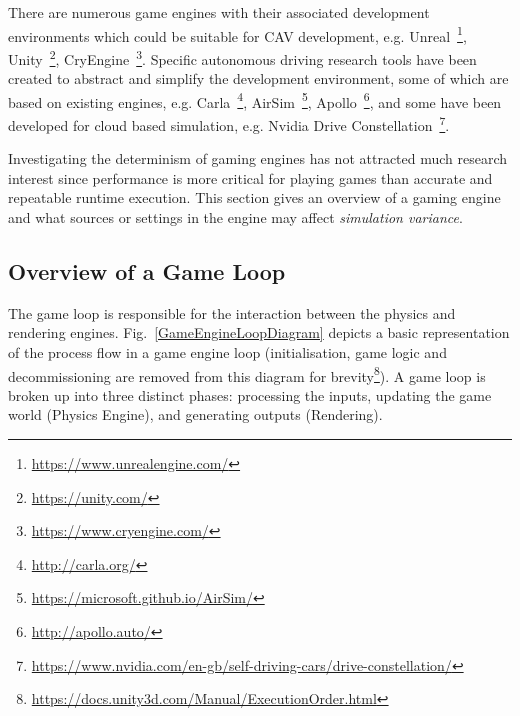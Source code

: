 \documentclass[letterpaper, 10 pt, journal, twoside]{IEEEtran}
\begin{document}
There are numerous game engines with their associated development environments which could be suitable for CAV development, e.g. Unreal~\footnote{\url{https://www.unrealengine.com/}}, Unity~\footnote{\url{https://unity.com/}}, CryEngine~\footnote{\url{https://www.cryengine.com/}}. Specific autonomous driving research tools have been created to abstract and simplify the development environment, some of which are based on existing engines, e.g. Carla~\footnote{\url{http://carla.org/}}, AirSim~\footnote{\url{https://microsoft.github.io/AirSim/}}, Apollo~\footnote{\url{http://apollo.auto/}}, and some have been developed for cloud based simulation, e.g. Nvidia Drive Constellation~\footnote{\url{https://www.nvidia.com/en-gb/self-driving-cars/drive-constellation/}}.

Investigating the determinism of gaming engines has not attracted much research interest since performance is more critical for playing games than accurate and repeatable runtime execution. %
This section gives an overview of a gaming engine and what sources or settings in the engine may affect \textit{simulation variance}.
%

\subsection{Overview of a Game Loop} \label{GameLoopSection}
The game loop is responsible for the interaction between the physics and rendering engines. Fig.~\ref{GameEngineLoopDiagram} depicts a basic representation of the process flow in a game engine loop (initialisation, game logic and decommissioning are removed from this diagram for brevity\footnote{\url{https://docs.unity3d.com/Manual/ExecutionOrder.html}}). A game loop is broken up into three distinct phases: processing the inputs, updating the game world (Physics Engine), and generating outputs (Rendering).~\cite{GameEngineArchBook}
\end{document}
